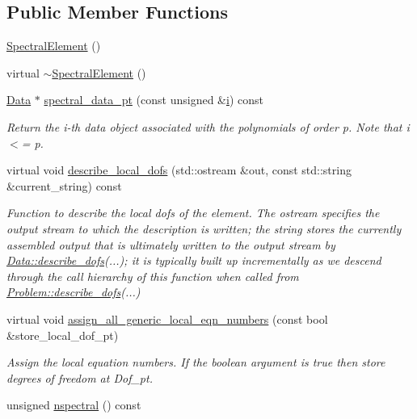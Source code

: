 \subsection*{Public Member Functions}
\begin{DoxyCompactItemize}
\item 
\hyperlink{classoomph_1_1SpectralElement_ad593a485187297e53b82cf9c22be8a11}{Spectral\+Element} ()
\item 
virtual \hyperlink{classoomph_1_1SpectralElement_a98d3738ce6703db8c52ccd19d82a3451}{$\sim$\+Spectral\+Element} ()
\item 
\hyperlink{classoomph_1_1Data}{Data} $\ast$ \hyperlink{classoomph_1_1SpectralElement_aa23ecaa19fb8eb9a64243b3053f5322c}{spectral\+\_\+data\+\_\+pt} (const unsigned \&\hyperlink{cfortran_8h_adb50e893b86b3e55e751a42eab3cba82}{i}) const
\begin{DoxyCompactList}\small\item\em Return the i-\/th data object associated with the polynomials of order p. Note that i $<$= p. \end{DoxyCompactList}\item 
virtual void \hyperlink{classoomph_1_1SpectralElement_a8482a26d6c6b1e278a5b98cdbb705d67}{describe\+\_\+local\+\_\+dofs} (std\+::ostream \&out, const std\+::string \&current\+\_\+string) const
\begin{DoxyCompactList}\small\item\em Function to describe the local dofs of the element. The ostream specifies the output stream to which the description is written; the string stores the currently assembled output that is ultimately written to the output stream by \hyperlink{classoomph_1_1Data_a2dae16e2dcff9a40029f834c83364df5}{Data\+::describe\+\_\+dofs}(...); it is typically built up incrementally as we descend through the call hierarchy of this function when called from \hyperlink{classoomph_1_1Problem_abc103804eb319ae0b3d43870cc3e1eaf}{Problem\+::describe\+\_\+dofs}(...) \end{DoxyCompactList}\item 
virtual void \hyperlink{classoomph_1_1SpectralElement_a36eeaa010b3a66ac9ee1556ee7dcc23d}{assign\+\_\+all\+\_\+generic\+\_\+local\+\_\+eqn\+\_\+numbers} (const bool \&store\+\_\+local\+\_\+dof\+\_\+pt)
\begin{DoxyCompactList}\small\item\em Assign the local equation numbers. If the boolean argument is true then store degrees of freedom at Dof\+\_\+pt. \end{DoxyCompactList}\item 
unsigned \hyperlink{classoomph_1_1SpectralElement_a930a352d4345327c8751165fa1e49a7b}{nspectral} () const
\end{DoxyCompactItemize}
